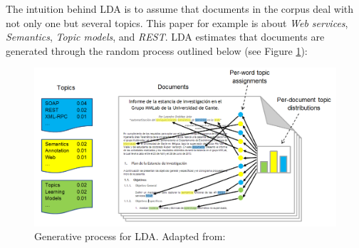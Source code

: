 The intuition behind LDA is to assume that documents in the corpus deal with not only one but several topics. This paper for example is about \emph{Web services}, \emph{Semantics}, \emph{Topic models}, and \emph{REST}. LDA estimates that documents are generated through the random process outlined below (see Figure \ref{lda-gen-process}): 

\begin{figure}
\includegraphics[scale=0.40]{images/lda-gen-model-eng}

\caption{Generative process for LDA. {\scriptsize Adapted from: \cite{Blei:2012}}}
\label{lda-gen-process}
\end{figure}

